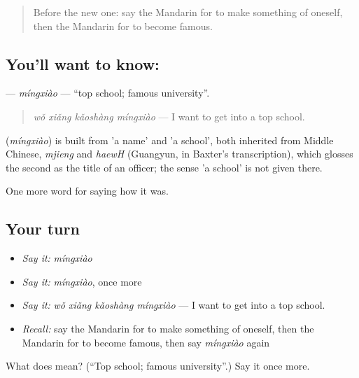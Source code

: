 \label{lesson:ZH-C512-mingxiao}



\begin{quote}
Before the new one: say the Mandarin for to make something of oneself, then the Mandarin for to become famous.
\end{quote}

\subsection*{You'll want to know: }
\textbf{} — \emph{míngxiào} — \textquotedblleft{}top school; famous university\textquotedblright{}.

\begin{quote}
\textbf{} \emph{wǒ xiǎng kǎoshàng míngxiào} — I want to get into a top school.
\end{quote}

\begin{cousinweb}
\textbf{} (\emph{míngxiào}) is built from  'a name' and  'a school', both inherited from Middle Chinese, \emph{mjieng} and \emph{haewH} (Guangyun, in Baxter's transcription), which glosses the second as the title of an officer; the sense 'a school' is not given there.
\end{cousinweb}

\begin{grammarlens}[title={What you've built}]
One more word for saying how it was.
\end{grammarlens}

\subsection*{Your turn}
\begin{itemize}
\raggedright
  \item \emph{Say it:} \emph{míngxiào}
  \item \emph{Say it:} \emph{míngxiào}, once more
  \item \emph{Say it:} \emph{wǒ xiǎng kǎoshàng míngxiào} — I want to get into a top school.
  \item \emph{Recall:} say the Mandarin for to make something of oneself, then the Mandarin for to become famous, then say \emph{míngxiào} again
\end{itemize}

\begin{tcolorbox}[breakable,colback=teal!4,colframe=teal!35!black,title={Before you move on}]
What does  mean? (\textquotedblleft{}Top school; famous university\textquotedblright{}.) Say it once more.
\end{tcolorbox}
